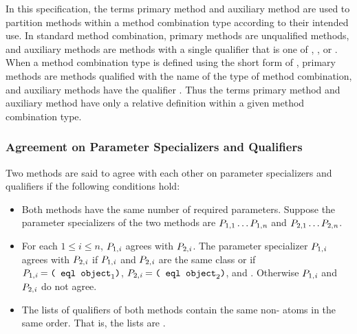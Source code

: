 In this specification, the terms {\bit primary method\/} and {\bit
auxiliary method\/} are used to partition methods within a method
combination type according to their intended use.  In standard method
combination, primary methods are unqualified methods, and auxiliary
methods are methods with a single qualifier that is one of 
, , or .  When a method combination
type is defined using the short form of 
, primary methods are methods qualified with
the name of the type of method combination, and auxiliary methods have
the qualifier .  Thus the terms {\bit primary method\/}
and {\bit auxiliary method\/} have only a relative definition within a
given method combination type.

\subsubsection{Agreement on Parameter Specializers and Qualifiers}
\label{Agreement-on-Parameter-Specializers-and-Qualifiers-SECTION}

Two methods are said to agree with each other on parameter specializers
and qualifiers if the following conditions hold:

\begin{itemize}

\item Both methods have the same number of required parameters.
Suppose the parameter specializers of the two methods are
$P_{1,1}\ldots P_{1,\hbox{\scriptsize\it n}}$
and $P_{2,1}\ldots P_{2,\hbox{\scriptsize\it n}}$.

\item For each $1\leq i\leq n$,
$P_{1,\hbox{\scriptsize\it i}}$ agrees with $P_{2,\hbox{\scriptsize\it i}}$.
The parameter specializer $P_{1,\hbox{\scriptsize\it i}}$
agrees with $P_{2,\hbox{\scriptsize\it i}}$ if
$P_{1,\hbox{\scriptsize\it i}}$ and $P_{2,\hbox{\scriptsize\it i}}$ are the same class or if 
$P\sub{1,\hbox{\scriptsize\it i}}=\hbox{{\tt(\cdf{eql} $\hbox{object}\sub 1$)}}$,
$P\sub{2,\hbox{\scriptsize\it i}}=\hbox{{\tt(\cdf{eql} $\hbox{object}\sub 2$)}}$, and
.
Otherwise $P_{1,\hbox{\scriptsize\it i}}$ and $P_{2,\hbox{\scriptsize\it i}}$ do not agree.


\item The lists of qualifiers of both methods contain the same 
non- atoms in the same order. That is, the lists are .

\end{itemize}


